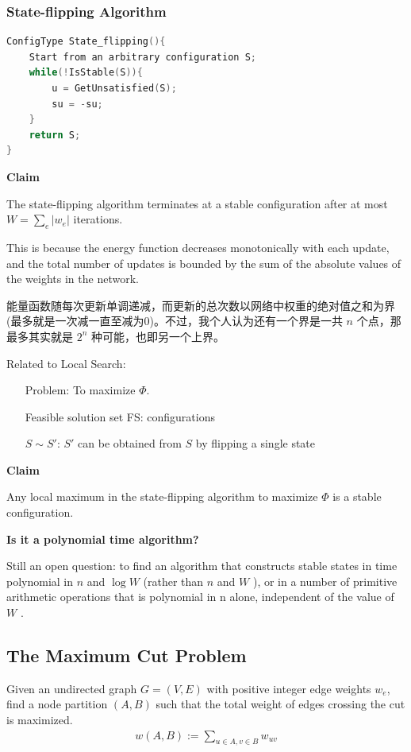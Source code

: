\documentclass{article}
\begin{document}
\subsubsection{State-flipping Algorithm}
\begin{lstlisting}[language={c}]
ConfigType State_flipping(){
    Start from an arbitrary configuration S;
    while(!IsStable(S)){
        u = GetUnsatisfied(S);
        su = -su;
    }
    return S;
}
\end{lstlisting}
\textbf{Claim}\par
The state-flipping algorithm terminates at a stable configuration after at most $\displaystyle W = \sum_e|w_e|$ iterations.\par

This is because the energy function decreases monotonically with each update, and the total number of updates is bounded by the sum of the absolute values of the weights in the network.

能量函数随每次更新单调递减，而更新的总次数以网络中权重的绝对值之和为界(最多就是一次减一直至减为0)。不过，我个人认为还有一个界是一共 $n$ 个点，那最多其实就是 $2^n$ 种可能，也即另一个上界。

Related to Local Search:
\begin{itemize}
    \item [Problem:]  To maximize $\Phi$.
    \item [Feasible solution] set FS: configurations
    \item [$S\sim S'$:] $S'$ can be obtained from $S$ by flipping a single state
\end{itemize}
\textbf{Claim}\par
Any local maximum in the state-flipping algorithm to maximize $\Phi$ is a stable configuration.\par

\textbf{Is it a polynomial time algorithm?}\par
Still an open question: to find an algorithm that constructs stable states in time polynomial in $n$ and $\log W$ (rather than $n$ and $W$ ), or in a number of primitive arithmetic operations that is polynomial in n alone, independent of the value of $W$ .

\subsection{The Maximum Cut Problem}
Given an undirected graph $G = (V, E)$ with positive integer edge weights $w_e$, find a node partition $(A, B)$ such that the total weight of edges crossing the cut is maximized.
\begin{align*}
    w(A,B):=\sum_{u\in A, v\in B}w_{uv}
\end{align*}
\end{document}
